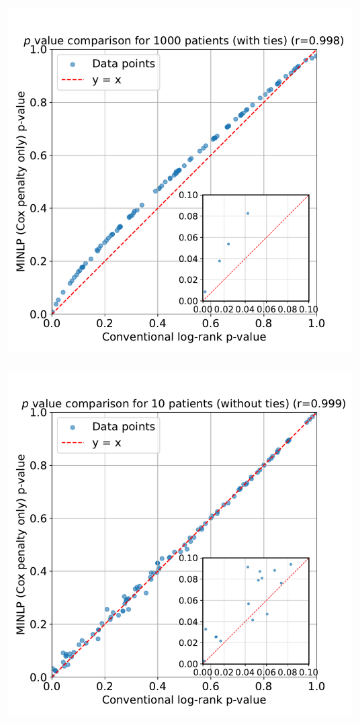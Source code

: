 \documentclass[article]{jss}
\begin{document}
\begin{figure}[ht]
\begin{subfigure}[t]{0.32\textwidth}
  \caption{\label{fig:compare-p-value-100-patients}}
\end{subfigure}
\begin{subfigure}[t]{0.32\textwidth}
  \centering
  \includegraphics[width=\linewidth]{p_value_comparison_1000_patients.pdf}
  \caption{\label{fig:compare-p-value-1000-patients}}
\end{subfigure}
\begin{subfigure}[t]{0.32\textwidth}
  \centering
  \includegraphics[width=\linewidth]{p_value_comparison_10_patients_no_ties.pdf}

\end{subfigure}
\end{figure}
\end{document}
